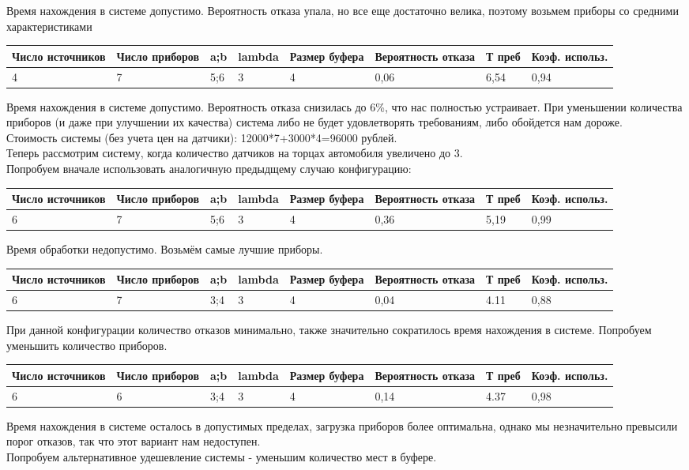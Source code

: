 \documentclass{article}
\begin{document}
	Время нахождения в системе допустимо. Вероятность отказа упала, но все еще достаточно велика, поэтому возьмем приборы со средними характеристиками
	\begin{tabular}{|p{2.1cm}|p{2.1cm}|p{0.5cm}|p{2.1cm}|p{2.1cm}|p{2.1cm}|p{2.1cm}|p{2.1cm}|}
		\hline
		Число источников&Число приборов&a;b&lambda&Размер буфера&Вероятность отказа&Т преб&Коэф. использ.\\ \hline
		4&7&5;6&3&4&0,06&6,54&0,94\\ \hline
	\end{tabular}
	Время нахождения в системе допустимо. Вероятность отказа снизилась до 6\%, что нас полностью устраивает. При уменьшении количества приборов (и даже при улучшении их качества) система либо не будет удовлетворять требованиям, либо обойдется нам дороже.\\
	Стоимость системы (без учета цен на датчики): 12000*7+3000*4=96000 рублей.\\
	Теперь рассмотрим систему, когда количество датчиков на торцах автомобиля увеличено до 3.\\
	Попробуем вначале использовать аналогичную предыдщему случаю конфигурацию:
	\begin{tabular}{|p{2.1cm}|p{2.1cm}|p{0.5cm}|p{2.1cm}|p{2.1cm}|p{2.1cm}|p{2.1cm}|p{2.1cm}|}
		\hline
		Число источников&Число приборов&a;b&lambda&Размер буфера&Вероятность отказа&Т преб&Коэф. использ.\\ \hline
		6&7&5;6&3&4&0,36&5,19&0,99\\ \hline
	\end{tabular}
	Время обработки недопустимо. Возьмём самые лучшие приборы.
	\begin{tabular}{|p{2.1cm}|p{2.1cm}|p{0.5cm}|p{2.1cm}|p{2.1cm}|p{2.1cm}|p{2.1cm}|p{2.1cm}|}
		\hline
		Число источников&Число приборов&a;b&lambda&Размер буфера&Вероятность отказа&Т преб&Коэф. использ.\\ \hline
		6&7&3;4&3&4&0,04&4.11&0,88\\ \hline
	\end{tabular}
	При данной конфигурации количество отказов минимально, также значительно сократилось время нахождения в системе. Попробуем уменьшить количество приборов.
	\begin{tabular}{|p{2.1cm}|p{2.1cm}|p{0.5cm}|p{2.1cm}|p{2.1cm}|p{2.1cm}|p{2.1cm}|p{2.1cm}|}
		\hline
		Число источников&Число приборов&a;b&lambda&Размер буфера&Вероятность отказа&Т преб&Коэф. использ.\\ \hline
		6&6&3;4&3&4&0,14&4.37&0,98\\ \hline
	\end{tabular}
	Время нахождения в системе осталось в допустимых пределах, загрузка приборов более оптимальна, однако мы незначительно превысили порог отказов, так что этот вариант нам недоступен.\\
	Попробуем альтернативное удешевление системы - уменьшим количество мест в буфере.
	
\end{document}
